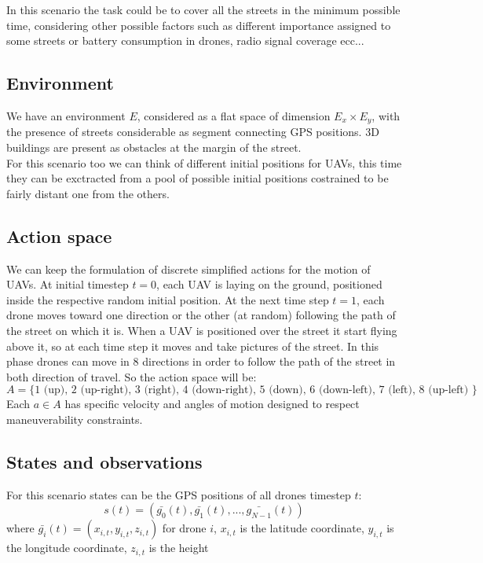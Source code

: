 \documentclass[LaM,binding=0.6cm]{sapthesis}
\begin{document}
In this scenario the task could be to cover all the streets in the minimum possible time, considering other possible factors such as different importance assigned to some streets or battery consumption in drones, radio signal coverage ecc...

\subsection*{Environment}
We have an environment $E$, considered as a flat space of dimension $E_x \times E_y$, with the presence of streets considerable as segment connecting GPS positions. 3D buildings are present as obstacles at the margin of the street.\\
For this scenario too we can think of different initial positions for UAVs, this time they can be exctracted from a pool of possible initial positions costrained to be fairly distant one from the others.

\subsection*{Action space}
We can keep the formulation of discrete simplified actions for the motion of UAVs.
At initial timestep $t=0$, each UAV is laying on the ground, positioned inside the respective random initial position.
At the next time step $t=1$, each drone moves toward one direction or the other (at random) following the path of the street on which it is.
When a UAV is positioned over the street it start flying above it, so at each time step it moves and take pictures of the street. In this phase drones can move in 8 directions in order to follow the path of the street in both direction of travel. So the action space will be: 
$$ A = \{ 1 \mbox{ (up), }
2 \mbox{ (up-right), }
3 \mbox{ (right), } 
4 \mbox{ (down-right), }
5\mbox{ (down), }
6 \mbox{ (down-left), }
7 \mbox{ (left), } 
8 \mbox{ (up-left) }
\}$$
Each $a \in A$ has specific velocity and angles of motion designed to respect maneuverability constraints.
\subsection*{States and observations}
For this scenario states can be the GPS positions of all drones  timestep $t$:
$$ s(t) = (\bar{g_0}(t),\bar{g_1}(t),...,\bar{g_{N-1}}(t))$$
where $\bar{g_i}(t) = (x_{i,t},y_{i,t},z_{i,t})$ for drone $i$, $x_{i,t}$ is the latitude coordinate, $y_{i,t}$ is the longitude coordinate, $z_{i,t}$ is the height
\end{document}
